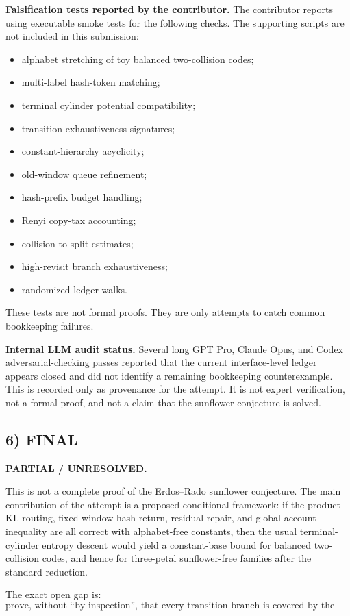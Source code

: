 \textbf{Falsification tests reported by the contributor.}
The contributor reports using executable smoke tests for the following checks.
The supporting scripts are not included in this submission:
\begin{itemize}
\item alphabet stretching of toy balanced two-collision codes;
\item multi-label hash-token matching;
\item terminal cylinder potential compatibility;
\item transition-exhaustiveness signatures;
\item constant-hierarchy acyclicity;
\item old-window queue refinement;
\item hash-prefix budget handling;
\item Renyi copy-tax accounting;
\item collision-to-split estimates;
\item high-revisit branch exhaustiveness;
\item randomized ledger walks.
\end{itemize}
These tests are not formal proofs.  They are only attempts to catch common
bookkeeping failures.

\textbf{Internal LLM audit status.}
Several long GPT Pro, Claude Opus, and Codex adversarial-checking passes
reported that the current interface-level ledger appears closed and did not
identify a remaining bookkeeping counterexample.  This is recorded only as
provenance for the attempt.  It is not expert verification, not a formal proof,
and not a claim that the sunflower conjecture is solved.

\subsection{6) FINAL}

\textbf{PARTIAL / UNRESOLVED.}

This is not a complete proof of the Erdos--Rado sunflower conjecture.  The
main contribution of the attempt is a proposed conditional framework:
if the product-KL routing, fixed-window hash return, residual repair, and
global account inequality are all correct with alphabet-free constants, then
the usual terminal-cylinder entropy descent would yield a constant-base bound
for balanced two-collision codes, and hence for three-petal sunflower-free
families after the standard reduction.

The exact open gap is:
\[
  \text{prove, without ``by inspection'', that every transition branch is
  covered by the one-step account inequalities above.}
\]

